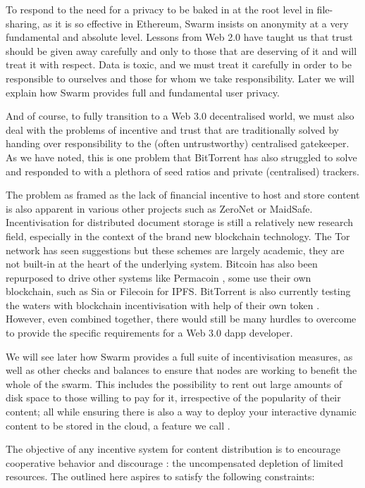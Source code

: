 To respond to the need for a privacy to be baked in at the root level in file-sharing, as it is so effective in Ethereum, Swarm insists on anonymity at a very fundamental and absolute level. Lessons from Web 2.0 have taught us that trust should be given away carefully and only to those that are deserving of it and will treat it with respect. Data is toxic, and we must treat it carefully in order to be responsible to ourselves and those for whom we take responsibility. Later we will explain how Swarm provides full and fundamental user privacy.

And of course, to fully transition to a Web 3.0 decentralised world, we must also deal with the problems of incentive and trust that are traditionally solved by handing over responsibility to the (often untrustworthy) centralised gatekeeper. As we have noted, this is one problem that BitTorrent has also struggled to solve and responded to with a plethora of seed ratios and private (centralised) trackers.

The problem as framed as the lack of financial incentive to host and store content is also apparent in various other projects such as ZeroNet or MaidSafe. Incentivisation for distributed document storage is still a relatively new research field, especially in the context of the brand new blockchain technology. The Tor network has seen suggestions \cite{jansen2014onions,ghoshetal2014tor} but these schemes are largely academic, they are not built-in at the heart of the underlying system. Bitcoin has also been repurposed to drive other systems like Permacoin \cite{miller2014permacoin}, some use their own blockchain, such as Sia \cite{vorick2014sia} or Filecoin \cite{filecoin2014} for IPFS. BitTorrent is also currently testing the waters with blockchain incentivisation with help of their own token \cite{tron2018,bittorrent2019}. However, even combined together, there would still be many hurdles to overcome to provide the specific requirements for a Web 3.0 dapp developer.

We will see later how Swarm provides a full suite of incentivisation measures, as well as other checks and balances to ensure that nodes are working to benefit the whole of the swarm. This includes the possibility to rent out large amounts of disk space to those willing to pay for it, irrespective of the popularity of their content; all while ensuring there is also a way to deploy your interactive dynamic content to be stored in the cloud, a feature we call .

The objective of any incentive system for  content distribution is to encourage cooperative behavior and discourage : the uncompensated depletion of limited resources. The  outlined here aspires to satisfy the following constraints:

